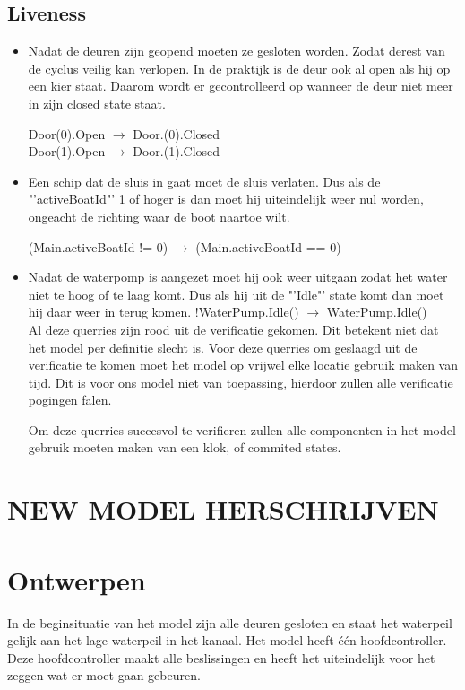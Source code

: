\documentclass{article}
\begin{document}
\subsection{Liveness}
\begin{itemize}

\item Nadat de deuren zijn geopend moeten ze gesloten worden. Zodat derest van
de cyclus veilig kan verlopen. In de praktijk is de deur ook al open als hij op
een kier staat. Daarom wordt er gecontrolleerd op wanneer de deur niet meer
in zijn closed state staat.

{\center
Door(0).Open $\rightarrow$ Door.(0).Closed\\
Door(1).Open $\rightarrow$ Door.(1).Closed\\
}
\item Een schip dat de sluis in gaat moet de sluis verlaten. Dus als de "'activeBoatId"' 1 of hoger is dan moet hij uiteindelijk weer nul worden, ongeacht de richting waar de boot naartoe wilt.

{\center
(Main.activeBoatId != 0) $\rightarrow$ (Main.activeBoatId == 0)\\
}

\item Nadat de waterpomp is aangezet moet hij ook weer uitgaan zodat het water niet te hoog of te laag komt. Dus als hij uit de "'Idle"' state komt dan moet hij daar weer in terug komen.
{\center
!WaterPump.Idle() $\rightarrow$ WaterPump.Idle()\\
}
\vskip0.5cm
Al deze querries zijn {\color{red}rood} uit de verificatie gekomen. Dit betekent niet dat het model per definitie slecht is. Voor deze querries om geslaagd uit de verificatie te komen moet het model op vrijwel elke locatie gebruik maken van tijd. Dit is voor ons model niet van toepassing, hierdoor zullen alle verificatie pogingen falen.

Om deze querries succesvol te verifieren zullen alle componenten in het model gebruik moeten maken van een klok, of commited states.

\end{itemize}



\clearpage %
\section{\Large\color{red} \textbf{NEW MODEL HERSCHRIJVEN}}
\section{Ontwerpen} %
In de beginsituatie van het model zijn alle deuren gesloten en staat het waterpeil gelijk aan het lage waterpeil in het kanaal. Het model heeft één hoofdcontroller. Deze hoofdcontroller maakt alle beslissingen en heeft het uiteindelijk voor het zeggen wat er moet gaan gebeuren.
\end{document}
